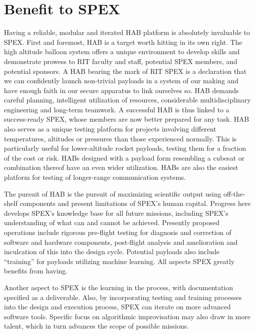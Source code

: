 \documentclass[conference]{IEEEtran} %
\begin{document}
\section{Benefit to SPEX}
\label{benefittospex}
Having a reliable, modular and iterated HAB platform is absolutely invaluable to SPEX. First and foremost, HAB is a target worth hitting in its own right. 
The high altitude balloon system offers a unique environment to develop skills and demonstrate prowess to RIT faculty and staff, potential SPEX members, and potential sponsors.
A HAB bearing the mark of RIT SPEX is a declaration that we can confidently launch non-trivial payloads in a system of our making and have enough faith in our secure apparatus to link ourselves so. 
HAB demands careful planning, intelligent utilization of resources, considerable multidisciplinary engineering and long-term teamwork. 
A successful HAB is thus linked to a success-ready SPEX, whose members are now better prepared for any task. 
HAB also serves as a unique testing platform for projects involving different temperatures, altitudes or pressures than those experienced normally. 
This is particularly useful for lower-altitude rocket payloads, testing them for a fraction of the cost or risk. 
HABs designed with a payload form resembling a cubesat or combination thereof have an even wider utilization. 
HABs are also the easiest platform for testing of longer-range communication systems.

The pursuit of HAB is the pursuit of maximizing scientific output using off-the-shelf components and present limitations of SPEX's human capital. 
Progress here develops SPEX's knowledge base for all future missions, including SPEX's understanding of what can and cannot be achieved. 
Presently proposed operations include rigorous pre-flight testing for diagnosis and correction of software and hardware components, post-flight analysis and amelioration and inculcation of this into the design cycle. 
Potential payloads also include ``training'' for payloads utilizing machine learning. 
All aspects SPEX greatly benefits from having.

Another aspect to SPEX is the learning in the process, with documentation specified as a deliverable. 
Also, by incorporating testing and training processes into the design and execution process, SPEX can iterate on more advanced software tools. 
Specific focus on algorithmic improvisation may also draw in more talent, which in turn advances the scope of possible missions.
\end{document}
